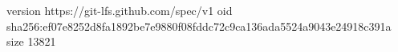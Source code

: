version https://git-lfs.github.com/spec/v1
oid sha256:ef07e8252d8fa1892be7e9880f08fddc72c9ca136ada5524a9043e24918c391a
size 13821
